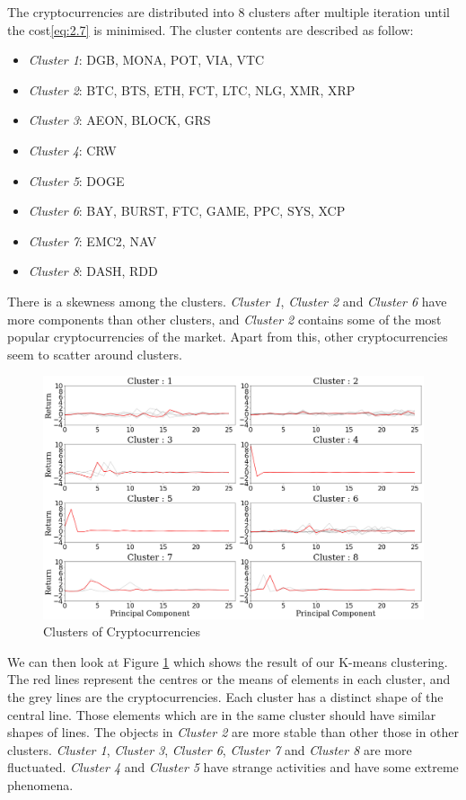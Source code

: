 \documentclass[11pt]{article} %
\theoremstyle{plain}
\theoremstyle{definition}
\begin{document}
The cryptocurrencies are distributed into 8 clusters after multiple iteration until the cost\eqref{eq:2.7} is minimised. The cluster contents are described as follow:
\begin{itemize}
    \item \textsl{Cluster 1}: DGB, MONA, POT, VIA, VTC
    \item \textsl{Cluster 2}: BTC, BTS, ETH, FCT, LTC, NLG, XMR, XRP
    \item \textsl{Cluster 3}: AEON, BLOCK, GRS
    \item \textsl{Cluster 4}: CRW
    \item \textsl{Cluster 5}: DOGE
    \item \textsl{Cluster 6}: BAY, BURST, FTC, GAME, PPC, SYS, XCP
    \item \textsl{Cluster 7}: EMC2, NAV
    \item \textsl{Cluster 8}: DASH, RDD
\end{itemize}

There is a skewness among the clusters. \textsl{Cluster 1}, \textsl{Cluster 2} and \textsl{Cluster 6} have more components than other clusters, and \textsl{Cluster 2} contains some of the most popular cryptocurrencies of the market. Apart from this, other cryptocurrencies seem to scatter around clusters.

\begin{figure}[ht]
    \includegraphics[width=1\linewidth, center]{resources/crypto_kmeans.png}
    \caption{Clusters of Cryptocurrencies}
    \label{fig:cryptokmeans}
\end{figure}

We can then look at Figure \ref{fig:cryptokmeans} which shows the result of our K-means clustering. The red lines represent the centres or the means of elements in each cluster, and the grey lines are the cryptocurrencies. Each cluster has a distinct shape of the central line. Those elements which are in the same cluster should have similar shapes of lines. The objects in \textsl{Cluster 2} are more stable than other those in other clusters. \textsl{Cluster 1}, \textsl{Cluster 3}, \textsl{Cluster 6}, \textsl{Cluster 7} and \textsl{Cluster 8} are more fluctuated. \textsl{Cluster 4} and \textsl{Cluster 5} have strange activities and have some extreme phenomena.
\end{document}
